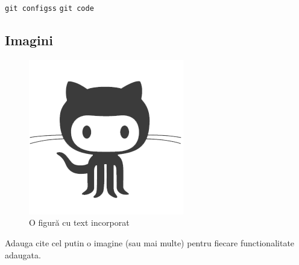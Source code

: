 \newcommand{\code}[1]{\texttt{#1}}
\code{git configss}
\tt git code



\subsection{Imagini}

\begin{figure}[htb]
	\begin{center}
		\includegraphics[scale = 1]{img/1.png}
		\caption{O figur\u{a} cu text incorporat}%
		\label{fig:generarea_ssh_key}
	\end{center}
\end{figure}

Adauga cite cel putin o imagine (sau mai multe) pentru fiecare functionalitate adaugata.

\clearpage